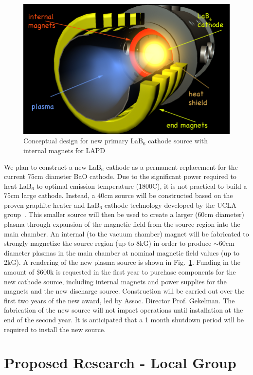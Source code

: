 \documentclass[11pt]{article}
\renewcommand{\cite}{\citep}
\begin{document}
\begin{figure}[!htbp]
\centerline{\includegraphics[width=4.0truein]{lab6-proposal}}
\caption{Conceptual design for new primary LaB$_6$ cathode source with
  internal magnets for LAPD}\label{newcath}
\end{figure}

We plan to construct a new LaB$_6$ cathode as a permanent replacement
for the current 75cm diameter BaO cathode.  Due to the significant power
required to heat LaB$_6$ to optimal emission temperature (1800C), it
is not practical to build a 75cm large cathode.  Instead, a 40cm source will
be constructed based on the proven graphite heater and LaB$_6$ cathode
technology developed by the UCLA group~\cite{cooper:2010}.  This smaller source will then
be used to create a larger (60cm diameter) plasma through expansion of
the magnetic field from the source region into the main chamber.  An
internal (to the vacuum chamber) magnet will be fabricated to strongly
magnetize the source region (up to 8kG) in order to produce $\sim
60$cm diameter plasmas in the main chamber at nominal magnetic field
values (up to 2kG).  A rendering of the new plasma source is shown in
Fig.~\ref{newcath}.  Funding in the amount of \$600k is
requested in the first year to purchase components for the new
cathode source, including internal magnets and power supplies for the
magnets and the new discharge source.  Construction  will be carried
out over the first two years of the new award, led by Assoc. Director
Prof. Gekelman.  The fabrication of the new source will not impact
operations until installation at the end of the second year.  It is
anticipated that a 1 month shutdown period will be required to install
the new source.  


\section{Proposed Research - Local Group}
\end{document}
